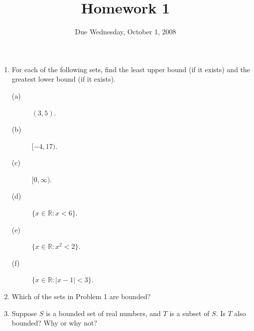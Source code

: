 \documentclass[12pt]{article}
\title{Homework 1}
\date{Due Wednesday, October 1, 2008}
\newcommand{\R}{\mathbb{R}}
\begin{document}
\maketitle

\begin{enumerate}
\item For each of the following sets, find the least upper bound (if it
exists) and the greatest lower bound (if it exists).

\begin{description}
\item[(a)] $(3,5)$.
\vfill
\item[(b)] $[-4,17)$.
\vfill
\item[(c)] $[0,\infty)$.
\vfill
\item[(d)] $\{ x \in \R : x < 6 \}$.
\vfill
\item[(e)] $\{ x \in \R : x^2 < 2 \}$.
\vfill
\item[(f)] $\{ x \in \R : |x - 1| < 3 \}$.
\vfill
\end{description}

\item Which of the sets in Problem 1 are bounded?
\vfill

\item Suppose $S$ is a bounded set of real numbers, and $T$ is a
  subset of $S$.  Is $T$ also bounded?  Why or why not?
\vfill

\end{enumerate}
\end{document}
